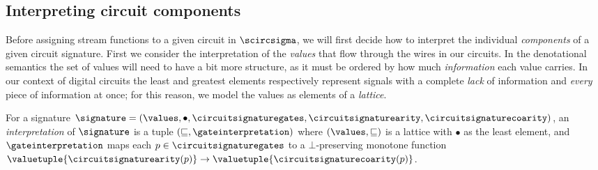 \documentclass{lmcs}
\begin{document}
\subsection{Interpreting circuit components}\label{sec:interpreting-components}

Before assigning stream functions to a given circuit in \(\scircsigma\), we will
first decide how to interpret the individual \emph{components} of a given
circuit signature.
First we consider the interpretation of the \emph{values} that flow through the
wires in our circuits.
In the denotational semantics the set of values will need to have a bit more
structure, as it must be ordered by how much \emph{information} each value
carries.
In our context of digital circuits the least and greatest elements respectively
represent signals with a complete \emph{lack} of information and \emph{every}
piece of information at once; for this reason, we model the values as elements
of a \emph{lattice}.

\begin{defi}[Interpretation]
    For a signature \(
    \signature = (
    \values, \bullet, \circuitsignaturegates, \circuitsignaturearity,
    \circuitsignaturecoarity
    )\), an \emph{interpretation} of
    \(\signature\) is a tuple \((\sqsubseteq, \gateinterpretation)\) where
    \((\values, \sqsubseteq)\) is a lattice with \(\bullet\) as the least
    element, and \(\gateinterpretation\) maps each
    \(p \in \circuitsignaturegates\) to a \(\bot\)-preserving monotone function
    \(
    \valuetuple{\circuitsignaturearity(p)}
    \to
    \valuetuple{\circuitsignaturecoarity(p)}
    \).
\end{defi}
\end{document}
